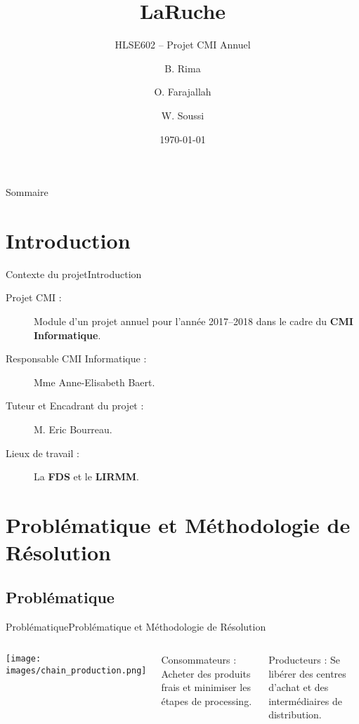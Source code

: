 \documentclass[usenames,dvipsnames]{beamer}
\title{LaRuche}
\subtitle{HLSE602 -- Projet CMI Annuel}
\author{B. Rima \and O. Farajallah \and W. Soussi}
\institute[UM]{L3 CMI Informatique}
\date{\today}
\begin{document}
\begin{frame}
\titlepage
\end{frame}
\begin{frame}{Sommaire}
\tableofcontents
\end{frame}
\section{Introduction}
\begin{frame}{Contexte du projet}{Introduction}
  \begin{description}
    \item [Projet CMI :] Module d'un projet annuel pour l'année 2017--2018 dans le cadre du \textbf{CMI Informatique}.
    \item [Responsable CMI Informatique :] Mme Anne-Elisabeth Baert.
    \item [Tuteur et Encadrant du projet :] M. Eric Bourreau.
    \item [Lieux de travail :] La \textbf{FDS} et le \textbf{LIRMM}.
  \end{description}
\end{frame}

\section{Problématique et Méthodologie de Résolution}
\subsection{Problématique}
\begin{frame}{Problématique}{Problématique et Méthodologie de Résolution}
\begin{columns}[onlytextwidth, T]
  \column{55mm}
    \texttt{[image: images/chain\_production.png]}

  \column{\dimexpr\linewidth-40mm-2mm}
    \begin{block}{Consommateurs :}
    Acheter des produits frais et minimiser les étapes de processing.
    \end{block}

    \begin{block}{Producteurs :}
    Se libérer des centres d'achat et des intermédiaires de distribution.
    \end{block}
\end{columns}
\end{frame}
\end{document}
